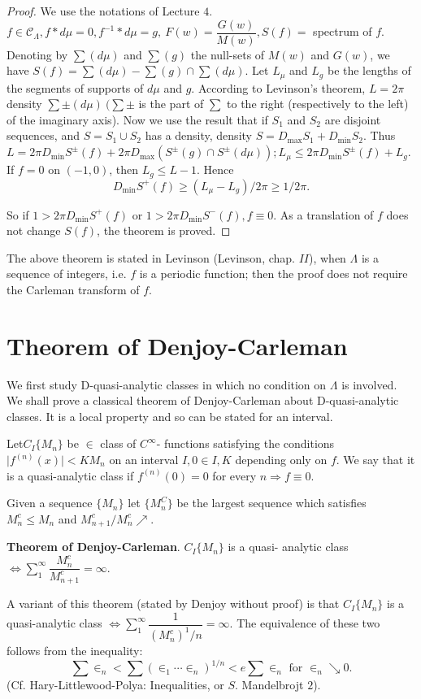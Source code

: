 \begin{proof}
 We use the notations of Lecture $4$. $f \in \mathscr{C}_\Lambda, f *
 d \mu = 0, f^{-1} * d \mu = g , ~ F(w) =
 \dfrac{G(w)}{M(w)}, S (f)=$ spectrum of $f$. Denoting by $\sum (d
 \mu) $ and $ \sum (g) $ the null-sets of $M(w)$ and $G(w)$, we have
 $S(f) = \sum (d \mu) - \sum (g) \cap \sum (d \mu)$. Let $L_\mu$ and
 $L_g$ be the lengths of the segments of supports of $d \mu$ and
 $g$. According to Levinson's theorem, $L = 2 \pi $ density $\sum \pm
 (d \mu) ~ (\sum \pm$ is the part of $\sum $ to the right
 (respectively to the left) of the imaginary axis). Now we use the
 result that if $S_1$ and $S_2$ are disjoint sequences, and $S = S_1
 \cup S_2$ has a density, density $S = D_{\max} S_1 + 
 D_{\min} S_2$. Thus $L = 2 \pi D_{\min} S^\pm (f) + 2 \pi D_{\max}
 (S^\pm (g) \cap S^\pm (d \mu)); L_\mu \le 2 \pi D_{\min} S^\pm (f) +
 L_g$. If $f = 0$ on $(-1, 0)$, then $L_g \le L- 1$. Hence 
 $$
 D_{\min} S^+ (f) \ge (L_\mu - L_g)/ 2 \pi \ge 1/2 \pi.
 $$

 So if $1>2 \pi D_{\min} S^+ (f) $ or $ 1 > 2 \pi D_{\min} S^- (f), f
 \equiv 0$. As a translation of $f$ does not change $S(f)$, the theorem
 is proved. 
\end{proof}

The above theorem is stated in Levinson (Levinson, chap. $II$), when
$\Lambda$ is a sequence of integers, i.e. $f$ is a periodic function;
then the proof does not require the Carleman transform of $f$. 

\section{Theorem of Denjoy-Carleman}\label{chap19:sec2}%

We first study D-quasi-analytic classes in which no condition on
$\Lambda$ is involved. We shall prove a classical theorem of
Denjoy-Carleman about D-quasi-analytic classes. It is a local property
and so can be stated for an interval. 

\begin{defi*}%
 Let\pageoriginale $C_I \{M_n\}$ be $\in $ class of $C^\infty$- functions
 satisfying the conditions $\big | f^{(n)} (x) \big | < K M_n$ on an
 interval $I, 0 \in I, K$ depending only on $f$. We say that it is a
 quasi-analytic class if $f^{(n)} (0) = 0$ for every $n \Rightarrow f
 \equiv 0$. 

 Given a sequence $\{M_n\}$ let $\{M^C_n\}$ be the largest sequence
 which satisfies $M^c_n \le M_n$ and $M^c_{n+1}/ M^c_n \nearrow$. 

 \noindent
 \textbf{Theorem of Denjoy-Carleman}. $C_I \{M_n\}$ is a quasi-
 analytic class $\Leftrightarrow \sum\limits_1^\infty
 \dfrac{M^c_n}{M^c_{n+1}} = \infty$. 
 
 A variant of this theorem (stated by Denjoy without proof) is that
 $C_I \{M_n\}$ is a quasi-analytic class $\Leftrightarrow
 \sum\limits_1^\infty \dfrac{1}{(M^c_n)^1/n} = \infty$. The
 equivalence of these two follows from the inequality: 
 $$
 \sum \in_n < \sum (\in_1 \cdots \in_n)^{1 /
 n } < e \sum \in_n \text { for } \in_n \searrow
 0. 
 $$
 (Cf. Hary-Littlewood-Polya: Inequalities, or $S$. Mandelbrojt $2$).
\end{defi*}

